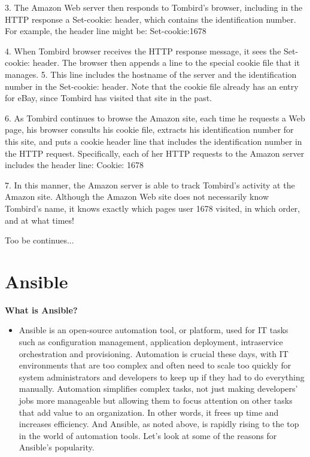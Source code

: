 \documentclass[fancy,11pt,titlestyle=display]{style/elegantbook}
\begin{document}
3. The Amazon Web server then responds to Tombird's browser, including in the HTTP response a Set-cookie: header, which contains the identification number. For example, the header line might be:
Set-cookie:1678


4. When Tombird browser receives the HTTP response message, it sees the Set-cookie: header. The browser then appends a line to the special cookie file that it manages.
5. This line includes the hostname of the server and the identification number in the Set-cookie: header. Note that the cookie file already has an entry for eBay, since Tombird has visited that site in the past. 

6. As Tombird continues to browse the Amazon site, each time he requests a Web page, his browser consults his cookie file, extracts his identification number for this site, and puts a cookie header line that includes the identification number in the HTTP request. Specifically, each of her HTTP requests to the Amazon server includes the header line:
Cookie: 1678 

7. In this manner, the Amazon server is able to track Tombird's activity at the Amazon site. Although the Amazon Web site does not necessarily know Tombird's name, it knows exactly which pages user 1678 visited, in which order, and at what times!

Too be continues...




\chapter{Ansible}
\textbf{What is Ansible?}
\begin{itemize}
\item Ansible is an open-source automation tool, or platform, used for IT tasks such as configuration management, application deployment, intraservice orchestration and provisioning. Automation is crucial these days, with IT environments that are too complex and often need to scale too quickly for system administrators and developers to keep up if they had to do everything manually. Automation simplifies complex tasks, not just making developers' jobs more manageable but allowing them to focus attention on other tasks that add value to an organization. In other words, it frees up time and increases efficiency. And Ansible, as noted above, is rapidly rising to the top in the world of automation tools. Let's look at some of the reasons for Ansible's popularity.
\end{itemize}
\end{document}
